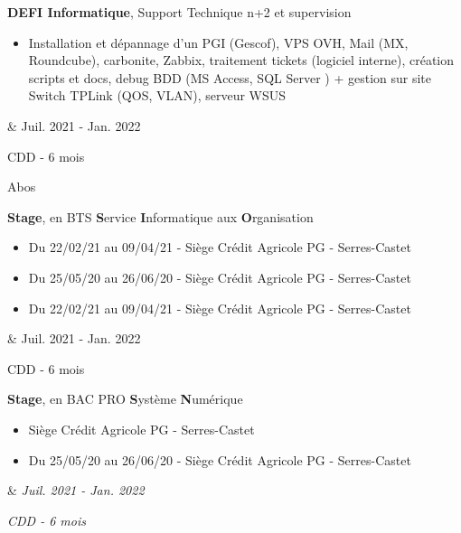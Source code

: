 \documentclass[12pt, letterpaper]{article}
\newenvironment{highlights}{
        \begin{itemize}[
                topsep=0pt,
                parsep=0.10 cm,
                partopsep=0pt,
                itemsep=0pt,
                after=\vspace{-1\baselineskip},
                leftmargin=0.4 cm + 3pt
            ]
    }{
        \end{itemize}
    } %
\let\originalTabularx\tabularx
\let\originalEndTabularx\endtabularx
\renewenvironment{tabularx}{\bgroup\centering\originalTabularx}{\originalEndTabularx\par\egroup}
\begin{document}
\vspace{0.2 cm}
\begin{tabularx}{
	\textwidth-0.4 cm-0.13cm
	}{
	K{0.2 cm}
	R{4.1 cm}
	}
	\textbf{DEFI Informatique}, Support Technique n+2 et supervision
	
	\vspace{0.10 cm}
	
	\begin{highlights}
	\item Installation et dépannage d'un PGI (Gescof), VPS OVH, Mail (MX, Roundcube), carbonite, Zabbix, traitement tickets (logiciel interne), création scripts et docs, debug BDD (MS Access, SQL Server ) + gestion sur site
	Switch TPLink (QOS, VLAN), serveur WSUS           \end{highlights}
	  &   
	Juil. 2021 - Jan. 2022
	
	CDD - 6 mois
	
	Abos
\end{tabularx}
\vspace{0.2 cm}
\begin{tabularx}{
	\textwidth-0.4 cm-0.13cm
	}{
	K{0.2 cm}
	R{4.1 cm}
	}
	\textbf{Stage}, en BTS \textbf{S}ervice \textbf{I}nformatique aux \textbf{O}rganisation
	
	\vspace{0.10 cm}
	
	\begin{highlights}
	\vspace{0.1cm}
	\item Du 22/02/21 au 09/04/21 - Siège Crédit Agricole PG - Serres-Castet
	\item Du 25/05/20 au 26/06/20 - Siège Crédit Agricole PG - Serres-Castet
	\item Du 22/02/21 au 09/04/21 - Siège Crédit Agricole PG - Serres-Castet
	\end{highlights}
	  &   
	Juil. 2021 - Jan. 2022
	
	CDD - 6 mois
\end{tabularx}
\vspace{0.2 cm}
\begin{tabularx}{
	\textwidth-0.4 cm-0.13cm
	}{
	K{0.2 cm}
	R{4.1 cm}
	}
	\textbf{Stage}, en BAC PRO \textbf{S}ystème \textbf{N}umérique 
	
	\vspace{0.10 cm}
	
	\begin{highlights}
	\vspace{0.1cm}
	\item Siège Crédit Agricole PG - Serres-Castet
	\item Du 25/05/20 au 26/06/20 - Siège Crédit Agricole PG - Serres-Castet
	\end{highlights}
	  &   
	\textit{Juil. 2021 - Jan. 2022}
	
	\textit{CDD - 6 mois}
\end{tabularx}
\end{document}
